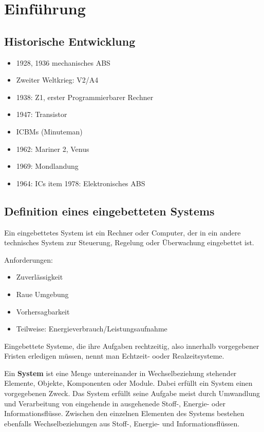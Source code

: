 \chapter{Einführung}
\section{Historische Entwicklung}
\begin{itemize}
    \item 1928, 1936 mechanisches ABS
    \item Zweiter Weltkrieg: V2/A4
    \item 1938: Z1, erster Programmierbarer Rechner
    \item 1947: Transistor
    \item ICBMs (Minuteman)
    \item 1962: Mariner 2, Venus
    \item 1969: Mondlandung
    \item 1964: ICs
    item 1978: Elektronisches ABS
\end{itemize}

\section{Definition eines eingebetteten Systems}
Ein eingebettetes System ist ein Rechner oder Computer, der in ein andere technisches System zur Steuerung, Regelung
oder Überwachung eingebettet ist.

Anforderungen:
\begin{itemize}
    \item Zuverlässigkeit
    \item Raue Umgebung
    \item Vorhersagbarkeit
    \item Teilweise: Energieverbrauch/Leistungsaufnahme
\end{itemize}

Eingebettete Systeme, die ihre Aufgaben rechtzeitig, also innerhalb vorgegebener Fristen erledigen müssen, nennt man
Echtzeit- ooder Realzeitsysteme.

\begin{tcolorbox}
Ein \textbf{System} ist eine Menge untereinander in Wechselbeziehung stehender Elemente,
Objekte, Komponenten oder Module. Dabei erfüllt ein System einen vorgegebenen Zweck.
Das System erfüllt seine Aufgabe meist durch Umwandlung und Verarbeitung von eingehende
in ausgehenede Stoff-, Energie- oder Informationsflüsse. Zwischen den einzelnen
Elementen des Systems bestehen ebenfalls Wechselbeziehungen aus Stoff-, Energie- und
Informationsflüssen.
\end{tcolorbox}

